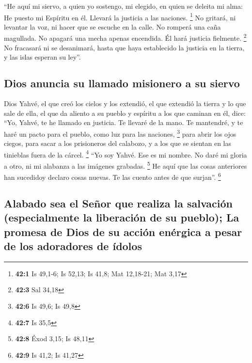  ``He aquí mi siervo, a quien yo sostengo, mi elegido, en
quien se deleita mi alma: He puesto mi Espíritu en él. Llevará la
justicia a las naciones. \footnote{\textbf{42:1} Is 49,1-6; Is 52,13; Is
  41,8; Mat 12,18-21; Mat 3,17}  No gritará, ni levantar
la voz, ni hacer que se escuche en la calle.  No romperá
una caña magullada. No apagará una mecha apenas encendida. Él hará
justicia fielmente. \footnote{\textbf{42:3} Sal 34,18}  No
fracasará ni se desanimará, hasta que haya establecido la justicia en la
tierra, y las islas esperan su ley''.

\hypertarget{dios-anuncia-su-llamado-misionero-a-su-siervo}{%
\subsection{Dios anuncia su llamado misionero a su
siervo}\label{dios-anuncia-su-llamado-misionero-a-su-siervo}}

 Dios Yahvé, el que creó los cielos y los extendió, el que
extendió la tierra y lo que sale de ella, el que da aliento a su pueblo
y espíritu a los que caminan en él, dice:  ``Yo, Yahvé, te
he llamado en justicia. Te llevaré de la mano. Te mantendré, y te haré
un pacto para el pueblo, como luz para las naciones, \footnote{\textbf{42:6}
  Is 49,6; Is 49,8}  para abrir los ojos ciegos, para
sacar a los prisioneros del calabozo, y a los que se sientan en las
tinieblas fuera de la cárcel. \footnote{\textbf{42:7} Is 35,5}
 ``Yo soy Yahvé. Ese es mi nombre. No daré mi gloria a
otro, ni mi alabanza a las imágenes grabadas. \footnote{\textbf{42:8}
  Éxod 3,15; Is 48,11}  He aquí que las cosas anteriores
han sucedidoy declaro cosas nuevas. Te las cuento antes de que surjan''.
\footnote{\textbf{42:9} Is 41,2; Is 41,27}

\hypertarget{alabado-sea-el-seuxf1or-que-realiza-la-salvaciuxf3n-especialmente-la-liberaciuxf3n-de-su-pueblo-la-promesa-de-dios-de-su-acciuxf3n-enuxe9rgica-a-pesar-de-los-adoradores-de-uxeddolos}{%
\subsection{Alabado sea el Señor que realiza la salvación (especialmente
la liberación de su pueblo); La promesa de Dios de su acción enérgica a
pesar de los adoradores de
ídolos}\label{alabado-sea-el-seuxf1or-que-realiza-la-salvaciuxf3n-especialmente-la-liberaciuxf3n-de-su-pueblo-la-promesa-de-dios-de-su-acciuxf3n-enuxe9rgica-a-pesar-de-los-adoradores-de-uxeddolos}}

